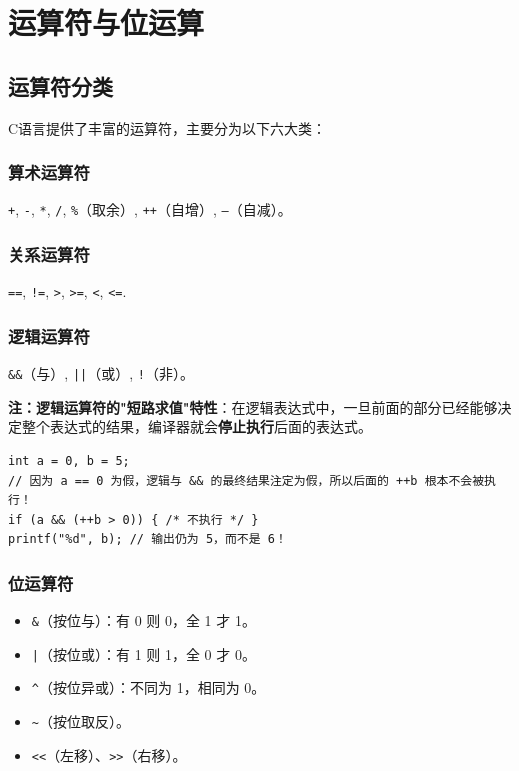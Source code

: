\clearpage
\begingroup
\let\clearpage\relax
\let\cleardoublepage\relax
\vspace*{\fill}
\chapter{运算符与位运算}
\vspace*{\fill}
\endgroup
\clearpage


\section{运算符分类}

C语言提供了丰富的运算符，主要分为以下六大类：

\subsection{算术运算符}

\texttt{+}, \texttt{-}, \texttt{*}, \texttt{/}, \texttt{\%}（取余）, \texttt{++}（自增）, \texttt{--}（自减）。

\subsection{关系运算符}

\texttt{==}, \texttt{!=}, \texttt{>}, \texttt{>=}, \texttt{<}, \texttt{<=}.

\subsection{逻辑运算符}

\texttt{\&\&}（与）, \texttt{||}（或）, \texttt{!}（非）。

\textbf{注：逻辑运算符的"短路求值"特性}：在逻辑表达式中，一旦前面的部分已经能够决定整个表达式的结果，编译器就会\textbf{停止执行}后面的表达式。

\begin{lstlisting}[caption={短路求值示例}]
int a = 0, b = 5;
// 因为 a == 0 为假，逻辑与 && 的最终结果注定为假，所以后面的 ++b 根本不会被执行！
if (a && (++b > 0)) { /* 不执行 */ }
printf("%d", b); // 输出仍为 5，而不是 6！
\end{lstlisting}

\subsection{位运算符}

\begin{itemize}
    \item \texttt{\&}（按位与）：有 0 则 0，全 1 才 1。
    \item \texttt{|}（按位或）：有 1 则 1，全 0 才 0。
    \item \texttt{\^{}}（按位异或）：不同为 1，相同为 0。
    \item \texttt{\textasciitilde}（按位取反）。
    \item \texttt{<<}（左移）、\texttt{>>}（右移）。
\end{itemize}

